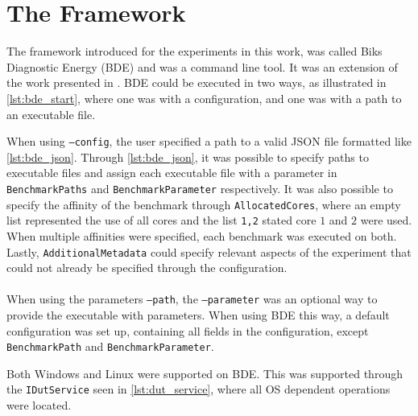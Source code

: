 \section{The Framework}\label{app:framework}

The framework introduced for the experiments in this work, was called Biks Diagnostic Energy (BDE) and was a command line tool. It was an extension of the work presented in \cite{biksbois}. BDE could be executed in two ways, as illustrated in \cref{lst:bde_start}, where one was with a configuration, and one was with a path to an executable file.



When using \texttt{--config}, the user specified a path to a valid JSON file formatted like \cref{lst:bde_json}. Through \cref{lst:bde_json}, it was possible to specify paths to executable files and assign each executable file with a parameter in \texttt{BenchmarkPaths} and \texttt{BenchmarkParameter} respectively. It was also possible to specify the affinity of the benchmark through \texttt{AllocatedCores}, where an empty list represented the use of all cores and the list \texttt{1,2} stated core $1$ and $2$ were used. When multiple affinities were specified, each benchmark was executed on both. Lastly, \texttt{AdditionalMetadata} could specify relevant aspects of the experiment that could not already be specified through the configuration.



\paragraph*{}
When using the parameters \texttt{--path}, the \texttt{--parameter} was an optional way to provide the executable with parameters. When using BDE this way, a default configuration was set up, containing all fields in the configuration, except \texttt{BenchmarkPath} and \texttt{BenchmarkParameter}.
\newpage



Both Windows and Linux were supported on BDE. This was supported through the \texttt{IDutService} seen in \cref{lst:dut_service}, where all OS dependent operations were located.



